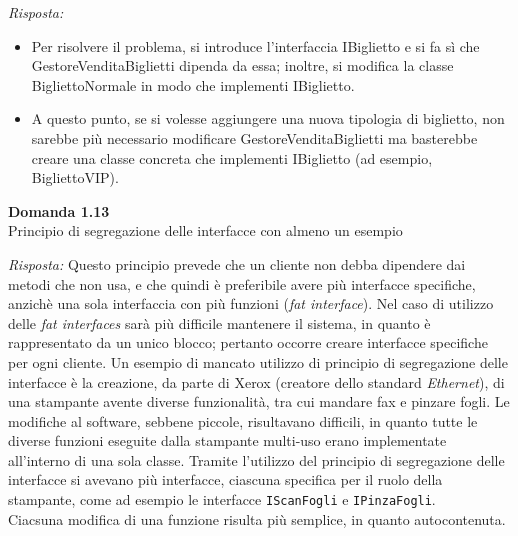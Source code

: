 \documentclass{article}
\newenvironment{problem}[2][Domanda]
    { \begin{mdframed}[backgroundcolor=gray!20] \textbf{#1 #2} \\}
    {  \end{mdframed}}
\newenvironment{solution}
    {\textit{Risposta:}}
    {}
\begin{document}
\begin{solution}
\begin{itemize}
	\item Per risolvere il problema, si introduce l'interfaccia IBiglietto e si fa sì che GestoreVenditaBiglietti dipenda da essa; inoltre, si modifica la classe BigliettoNormale in modo che implementi IBiglietto.
	\item A questo punto, se si volesse aggiungere una nuova tipologia di biglietto, non sarebbe più necessario modificare GestoreVenditaBiglietti ma basterebbe creare una classe concreta che implementi IBiglietto (ad esempio, BigliettoVIP).
\end{itemize}
\end{solution}


\begin{problem}{1.13}
Principio di segregazione delle interfacce con almeno un esempio
\end{problem}
\begin{solution}
Questo principio prevede che un cliente non debba dipendere dai metodi che non usa, e che quindi è preferibile avere più interfacce specifiche, anzichè una sola interfaccia con più funzioni (\textit{fat interface}).
\newline
Nel caso di utilizzo delle \textit{fat interfaces} sarà più difficile mantenere il sistema, in quanto è rappresentato da un unico blocco; pertanto occorre creare interfacce specifiche per ogni cliente.
\newline
Un esempio di mancato utilizzo di principio di segregazione delle interfacce è la creazione, da parte di Xerox (creatore dello standard \textit{Ethernet}), di una stampante avente diverse funzionalità, tra cui mandare fax e pinzare fogli. Le modifiche al software, sebbene piccole, risultavano difficili, in quanto tutte le diverse funzioni eseguite dalla stampante multi-uso erano implementate all'interno di una sola classe.
Tramite l'utilizzo del principio di segregazione delle interfacce si avevano più interfacce, ciascuna specifica per il ruolo della stampante, come ad esempio le interfacce \texttt{IScanFogli} e \texttt{IPinzaFogli}.
\\
Ciacsuna modifica di una funzione risulta più semplice, in quanto autocontenuta.
\end{solution}
\end{document}
